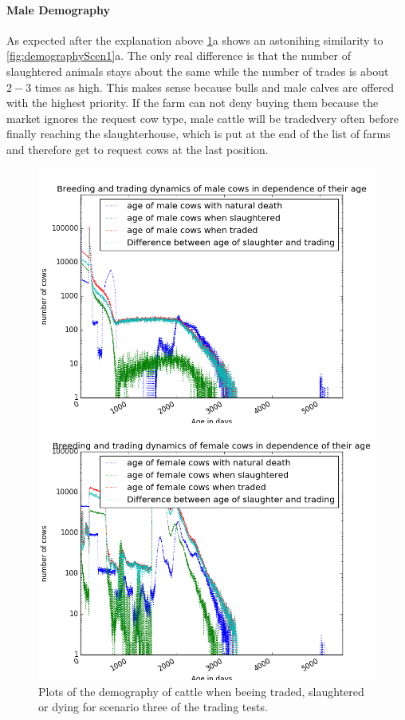 \paragraph{Male Demography}
As expected after the explanation above \ref{fig:demographyScen3}a shows an astonihing similarity to \ref{fig:demographyScen1}a. The only real difference is that the number of slaughtered animals stays about the same while the number of trades is about $2-3$ times as high. This makes sense because bulls and male calves are offered with the highest priority. If the farm can not deny buying them because the market ignores the request cow type, male cattle will be tradedvery often before finally reaching the slaughterhouse, which is put at the end of the list of farms and therefore get to request cows at the last position.
\begin{figure}[htbp]
\begin{minipage}{0.5\textwidth}
\centering
\noindent\includegraphics[width=0.9\linewidth,height=\textheight,
keepaspectratio]{scen3maleDemography.png} 
\end{minipage}
\begin{minipage}{0.5\textwidth}
\centering
\noindent\includegraphics[width=0.9\linewidth,height=\textheight,
keepaspectratio]{scen3femaleDemography.png} 
\end{minipage}
\caption[Demography in Scenario 3]{Plots of the demography of cattle when beeing traded, slaughtered or dying for scenario three of the trading tests.}
\label{fig:demographyScen3}
\end{figure} 
